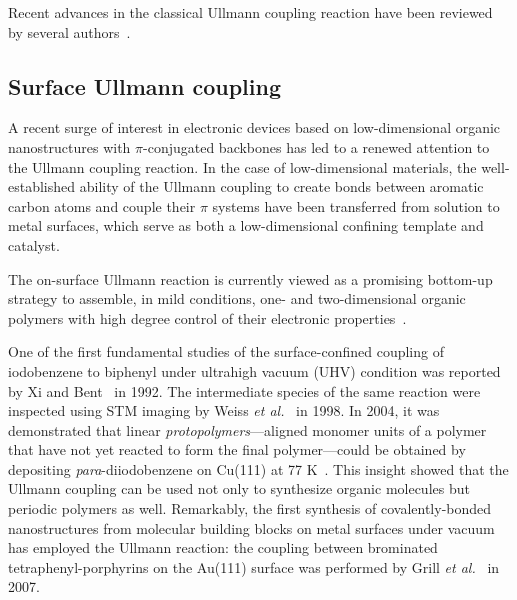 \documentclass[%
 reprint,
 amsmath,amssymb,
 aps,
prb,
]{revtex4-2}
\begin{document}
Recent advances in the classical Ullmann coupling reaction have been reviewed by several authors~\cite{ullmann_29,ullmann_30,ullmann_31,ullmann_32}.



\subsection{Surface Ullmann coupling}

A recent surge of interest in electronic devices based on low-dimensional organic nanostructures with $\pi$-conjugated backbones has led to a renewed attention to the Ullmann coupling reaction. 
In the case of low-dimensional materials, the well-established ability of the Ullmann coupling to create bonds between aromatic carbon atoms and couple their $\pi$ systems have been transferred from solution to metal surfaces, which serve as both a low-dimensional confining template and catalyst.

The on-surface Ullmann reaction is currently viewed as a promising bottom-up strategy to assemble, in mild conditions, one- and two-dimensional organic polymers with high degree control of their electronic properties~\cite{ullmann_33}. 

One of the first fundamental studies of the surface-confined coupling of iodobenzene to biphenyl under ultrahigh vacuum (UHV) condition was reported by Xi and Bent~\cite{sur_sci01} in 1992.
%
The intermediate species of the same reaction were inspected using STM imaging by Weiss \textit{et al.}~\cite{langm01} in 1998. 
In 2004, it was demonstrated that linear \emph{protopolymers}---aligned monomer units of a polymer that have not yet reacted to form the final polymer---could be obtained by depositing \textit{para}-diiodobenzene on Cu(111) at 77 K~\cite{jacs01}. 
This insight showed that the Ullmann coupling can be used not only to synthesize organic molecules but periodic polymers as well.
Remarkably, the first synthesis of covalently-bonded nanostructures from molecular building blocks on metal surfaces under vacuum has employed the Ullmann reaction: the coupling between brominated tetraphenyl-porphyrins on the Au(111) surface was performed by Grill \textit{et al.}~\cite{Naturenano2007} in 2007.
\end{document}
